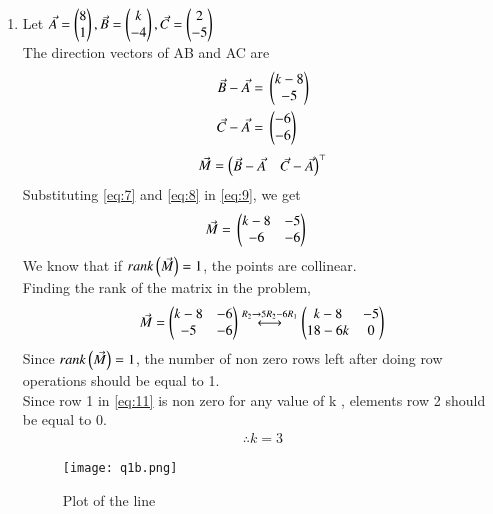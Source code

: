 \documentclass[journal,12pt,twocolumn]{IEEEtran}
\begin{document}
\begin{enumerate}
\item Let $\Vec{A}=\begin{pmatrix}8\\1\end{pmatrix}, \Vec{B}=\begin{pmatrix}k \\ -4\end{pmatrix}, \Vec{C}=\begin{pmatrix}2 \\ -5\end{pmatrix}$\\
The direction vectors of AB and AC are
\begin{align}
\label{eq:7}
\Vec{B} - \Vec{A} ={}& \begin{pmatrix}k-8\\-5\end{pmatrix}\\
\label{eq:8}
\Vec{C} - \Vec{A} ={}& \begin{pmatrix}-6 \\ -6\end{pmatrix}
\end{align}
\begin{align}
\label{eq:9}
\Vec{M} =\begin{pmatrix}\Vec{B}-\Vec{A} & \Vec{C}-\Vec{A}\end{pmatrix}^\top
\end{align}
Substituting \eqref{eq:7} and \eqref{eq:8} in \eqref{eq:9}, we get
\begin{align}
\label{eq:10}
\Vec{M}={}&\begin{pmatrix}k-8 & -5 \\ -6 & -6\end{pmatrix}
\end{align}
We know that if $rank\left(\Vec{M}\right)=1$, the points are collinear.\\
Finding the rank of the matrix in the problem,
\begin{align}
\label{eq:11}
\Vec{M} = \begin{pmatrix}k-8 & -6 \\ -5 & -6\end{pmatrix} \overset{R_{2}\rightarrow 5R_{2}-6R_{1}}{\longleftrightarrow} \begin{pmatrix}k-8 & -5 \\ 18-6k & 0\end{pmatrix}
\end{align}
Since $rank\left(\Vec{M}\right)=1$, the number of non zero rows left after doing row operations should be equal to 1.\\
Since row 1 in \eqref{eq:11} is non zero for any value of k , elements row 2 should be equal to 0.
\begin{align}
\therefore k=3
\end{align}

\begin{figure}[!h]
\centering
\texttt{[image: q1b.png]}
\caption{Plot of the line}
\end{figure}

\end{enumerate}
\end{document}
